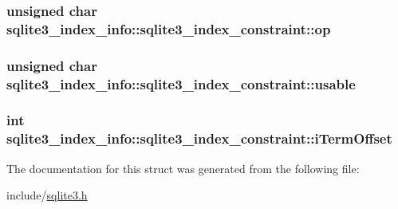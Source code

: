 \hypertarget{structsqlite3__index__info_1_1sqlite3__index__constraint_362f4ec1f71975cb0ac39a8b5e4b1476}{
\subsubsection[op]{\setlength{\rightskip}{0pt plus 5cm}unsigned char {\bf sqlite3\_\-index\_\-info::sqlite3\_\-index\_\-constraint::op}}}
\label{structsqlite3__index__info_1_1sqlite3__index__constraint_362f4ec1f71975cb0ac39a8b5e4b1476}


\hypertarget{structsqlite3__index__info_1_1sqlite3__index__constraint_e16e62caeab743cc68bb22227dacb501}{
\subsubsection[usable]{\setlength{\rightskip}{0pt plus 5cm}unsigned char {\bf sqlite3\_\-index\_\-info::sqlite3\_\-index\_\-constraint::usable}}}
\label{structsqlite3__index__info_1_1sqlite3__index__constraint_e16e62caeab743cc68bb22227dacb501}


\hypertarget{structsqlite3__index__info_1_1sqlite3__index__constraint_4e8368da66f34b7f07b369984b813d1b}{
\subsubsection[iTermOffset]{\setlength{\rightskip}{0pt plus 5cm}int {\bf sqlite3\_\-index\_\-info::sqlite3\_\-index\_\-constraint::iTermOffset}}}
\label{structsqlite3__index__info_1_1sqlite3__index__constraint_4e8368da66f34b7f07b369984b813d1b}




The documentation for this struct was generated from the following file:\begin{CompactItemize}
\item 
include/\hyperlink{sqlite3_8h}{sqlite3.h}\end{CompactItemize}
